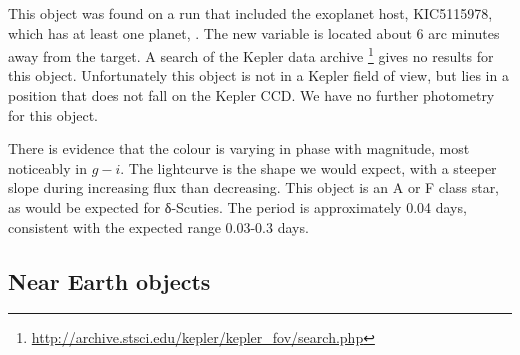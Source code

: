   This object was found on a run that included the exoplanet host, KIC5115978, which has at least one planet, \cite{KIC5115978}. The new variable is located about 6 arc minutes away from the target. A search of the Kepler data archive \footnote{\url{http://archive.stsci.edu/kepler/kepler_fov/search.php}} gives no results for this object. Unfortunately this object is not in a Kepler field of view, but lies in a position that does not fall on the Kepler CCD. We have no further photometry for this object. 

  There is evidence that the colour is varying in phase with magnitude, most noticeably in $g-i$. The lightcurve is the shape we would expect, with a steeper slope during increasing flux than decreasing. This object is an A or F class star, as would be expected for δ-Scuties. The period is approximately 0.04 days, consistent with the expected range 0.03-0.3 days.


\newpage
\subsection{Near Earth objects}

